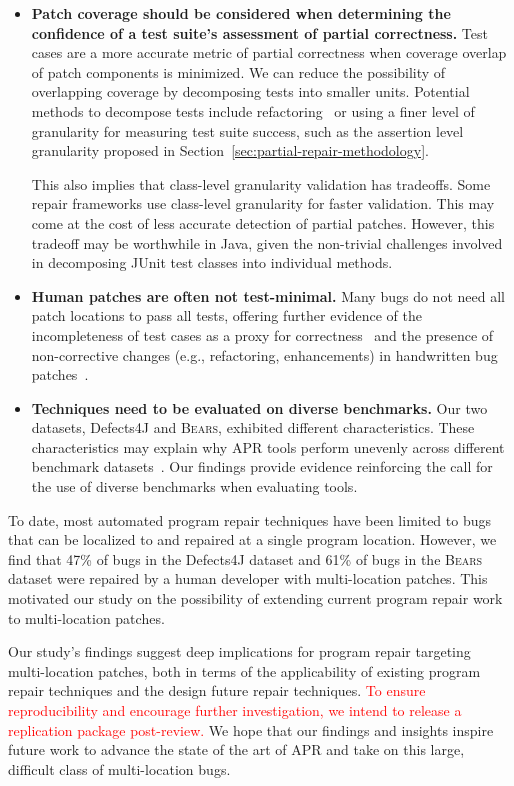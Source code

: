 \documentclass[10pt, conference]{IEEEtran}
\newcommand\todo[1]{\textcolor{red}{#1}}
\newcommand\bears{\textsc{Bears}\xspace}
\begin{document}
\begin{itemize}[wide, labelindent=0pt]
\item\textbf{Patch coverage should be considered when determining the
  confidence of a test suite's assessment of partial correctness.}
Test cases are a more accurate metric of partial correctness when coverage
overlap of patch components is minimized.
We can reduce the possibility of overlapping coverage by decomposing tests into
smaller units. Potential methods to decompose tests include
refactoring~\cite{b-refactoring} or using a finer level of granularity for
measuring test suite success, such as the assertion level granularity proposed
in Section~\ref{sec:partial-repair-methodology}.

This also implies that class-level granularity validation has tradeoffs. Some
repair frameworks use class-level granularity for faster validation. This may
come at the cost of less accurate detection of partial patches. However, this
tradeoff may be worthwhile in Java, given the non-trivial challenges involved in
decomposing JUnit test classes into individual methods.

\item\textbf{Human patches are often not test-minimal.}
Many bugs do not need all patch locations to pass all tests,
offering further evidence of the incompleteness of test cases as a
proxy for correctness~\cite{patch-correctness} and the
presence of non-corrective changes (e.g., refactoring, enhancements)
in handwritten bug patches~\cite{api-refactoring, tangledchanges}.

\item\textbf{Techniques need to be evaluated on diverse benchmarks.}
Our two datasets, Defects4J and \bears, exhibited different characteristics.
These characteristics may explain why APR tools perform unevenly across
different benchmark datasets~\cite{durieux-repair-them-all}. Our findings
provide evidence reinforcing the call for the use of diverse benchmarks when
evaluating tools.
\end{itemize}

To date, most automated program repair techniques have been limited to bugs that
can be localized to and repaired at a single program location. However, we find
that 47\% of bugs in the Defects4J dataset and 61\% of bugs in the \bears dataset
were repaired by a human developer with multi-location patches. This motivated
our study on the possibility of extending current program repair work to
multi-location patches.

Our study's findings suggest deep implications for program repair targeting
multi-location patches, both in terms of the applicability of existing program
repair techniques and the design future repair techniques. \todo{To ensure
reproducibility and encourage further investigation, we intend to release a
replication package post-review.}
We hope that our findings and insights inspire future work to advance 
the state of the art of APR and take on this large, difficult class of 
multi-location bugs.



\end{document}
